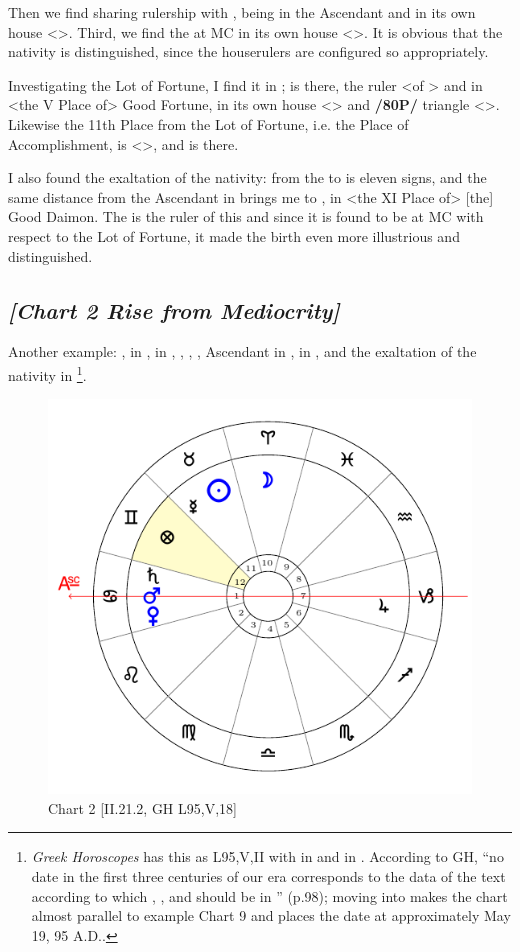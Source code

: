 Then we find \Venus\xspace sharing rulership with \Mars, being in the Ascendant and in its own house <\Libra>. Third, we find the \Moon\xspace at MC in its own house <\Cancer>. It is obvious that the nativity is distinguished, since the houserulers are configured so appropriately. 

Investigating the Lot of Fortune, I find it in \Aquarius; \Saturn\xspace is there, the ruler <of \Aquarius> and in <the V Place of> Good Fortune, in its own house <\Aquarius> and \textbf{/80P/} triangle <\Aquarius\xspace \Libra\xspace \Gemini>. Likewise the 11th Place from the Lot of Fortune, i.e. the Place of Accomplishment, is <\Sagittarius>, and \Jupiter\xspace is there.

I also found the exaltation of the nativity: from the \Moon\xspace to \Taurus\xspace is eleven signs, and the same distance from the Ascendant in \Libra\xspace brings me to \Leo, in <the XI Place of> [the] Good Daimon. The \Sun\xspace is the ruler of this and since it is found to be at MC with respect to the Lot of Fortune, it made the birth even more illustrious and distinguished.
\newpage
\subsection*{\textit{[Chart 2 Rise from Mediocrity]}}

Another example: \Sun, \Mercury\xspace in \Taurus, \Moon\xspace in \Aries, \Saturn, \Mars, \Venus, Ascendant in \Cancer,
\Jupiter\xspace in \Capricorn, \Fortune\xspace and the exaltation of the nativity in \Gemini
\footnote{\textit{Greek Horoscopes} has this as L95,V,II with \Saturn\xspace in \Leo\xspace and \Jupiter\xspace in \Virgo. According to GH, ``no date in the first three centuries of our era corresponds to the data of the text according to which \Saturn, \Mars, and \Venus\xspace should be in \Cancer'' (p.98); moving \Saturn\xspace into \Leo\xspace makes the chart almost parallel to example Chart 9 and places the date at approximately May 19, 95 A.D..}.

\clearpage
\begin{figure}
\centering

\includegraphics[width=.68\textwidth]{charts/2_21_2}
\caption{Chart 2 [II.21.2, GH L95,V,18]}
\label{fig:chart02}
\end{figure}

